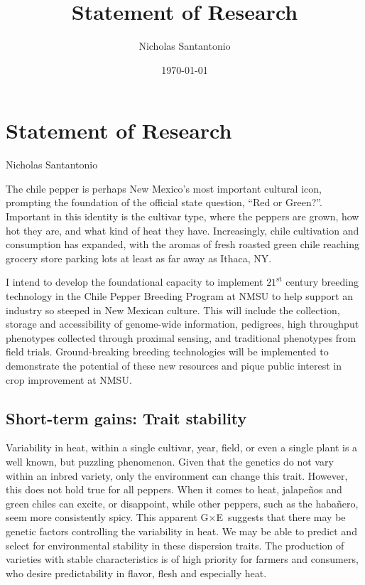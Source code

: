 \documentclass[11pt]{article}
\title{Statement of Research}
\author{Nicholas Santantonio}
\date{\today}
\newcommand{\gxe}{G$\times$E}
\begin{document}
\section*{\centering Statement of Research}
\begin{center} Nicholas Santantonio \end{center}

\noindent The chile pepper is perhaps New Mexico's most important cultural icon, prompting the foundation of the official state question, ``Red or Green?''. Important in this identity is the cultivar type, where the peppers are grown, how hot they are, and what kind of heat they have. Increasingly, chile cultivation and consumption has expanded, with the aromas of fresh roasted green chile reaching grocery store parking lots at least as far away as Ithaca, NY. 

I intend to develop the foundational capacity to implement $21^\text{st}$ century breeding technology in the Chile Pepper Breeding Program at NMSU to help support an industry so steeped in New Mexican culture. This will include the collection, storage and accessibility of genome-wide information, pedigrees, high throughput phenotypes collected through proximal sensing, and traditional phenotypes from field trials. Ground-breaking breeding technologies will be implemented to demonstrate the potential of these new resources and pique public interest in crop improvement at NMSU.  


\subsection*{Short-term gains: Trait stability}


Variability in heat, within a single cultivar, year, field, or even a single plant is a well known, but puzzling phenomenon. Given that the genetics do not vary within an inbred variety, only the environment can change this trait. However, this does not hold true for all peppers. When it comes to heat, jalape\~{n}os and green chiles can excite, or disappoint, while other peppers, such as the haba\~{n}ero, seem more consistently spicy. This apparent \gxe\, suggests that there may be genetic factors controlling the variability in heat. We may be able to predict and select for environmental stability in these dispersion traits. The production of varieties with stable characteristics is of high priority for farmers and consumers, who desire predictability in flavor, flesh and especially heat. 
\end{document}
